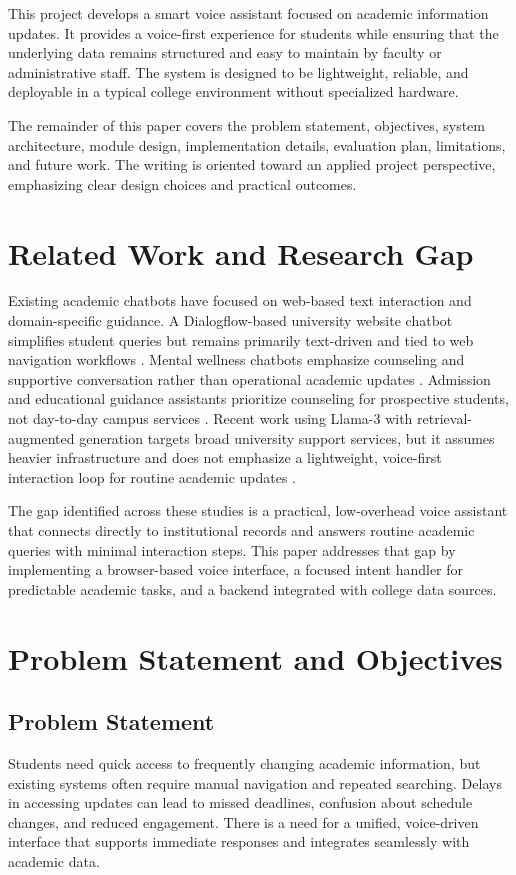﻿\documentclass[conference]{IEEEtran}
\begin{document}
This project develops a smart voice assistant focused on academic information updates. It provides a voice-first experience for students while ensuring that the underlying data remains structured and easy to maintain by faculty or administrative staff. The system is designed to be lightweight, reliable, and deployable in a typical college environment without specialized hardware.

The remainder of this paper covers the problem statement, objectives, system architecture, module design, implementation details, evaluation plan, limitations, and future work. The writing is oriented toward an applied project perspective, emphasizing clear design choices and practical outcomes.

\section{Related Work and Research Gap}
Existing academic chatbots have focused on web-based text interaction and domain-specific guidance. A Dialogflow-based university website chatbot simplifies student queries but remains primarily text-driven and tied to web navigation workflows \cite{b1}. Mental wellness chatbots emphasize counseling and supportive conversation rather than operational academic updates \cite{b2}. Admission and educational guidance assistants prioritize counseling for prospective students, not day-to-day campus services \cite{b3}. Recent work using Llama-3 with retrieval-augmented generation targets broad university support services, but it assumes heavier infrastructure and does not emphasize a lightweight, voice-first interaction loop for routine academic updates \cite{b4,b5}.

The gap identified across these studies is a practical, low-overhead voice assistant that connects directly to institutional records and answers routine academic queries with minimal interaction steps. This paper addresses that gap by implementing a browser-based voice interface, a focused intent handler for predictable academic tasks, and a backend integrated with college data sources.

\section{Problem Statement and Objectives}
\subsection{Problem Statement}
Students need quick access to frequently changing academic information, but existing systems often require manual navigation and repeated searching. Delays in accessing updates can lead to missed deadlines, confusion about schedule changes, and reduced engagement. There is a need for a unified, voice-driven interface that supports immediate responses and integrates seamlessly with academic data.
\end{document}

